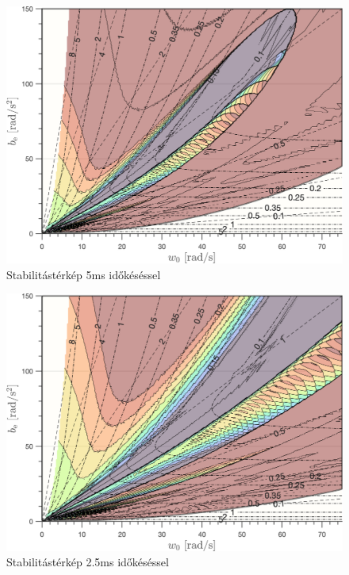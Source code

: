 \begin{figure}[H]
    \begin{center}
    \includegraphics[width=\textwidth]{images/stab_map_0005.png}
    \caption{Stabilitástérkép 5ms időkéséssel}\label{fig:stab_map_0005}
    \end{center}
\end{figure}

\begin{figure}[H]
    \begin{center}
    \includegraphics[width=\textwidth]{images/stab_map_00025.png}
    \caption{Stabilitástérkép 2.5ms időkéséssel}\label{fig:stab_map_00025}
    \end{center}
\end{figure}

